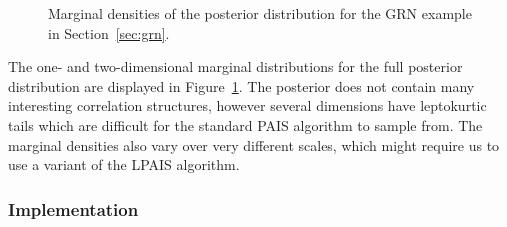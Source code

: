 \documentclass[final]{siamltex}
\begin{document}
\begin{figure}[htb]
\centering
{}%
\caption{Marginal densities of the posterior distribution for the GRN example in Section~\ref{sec:grn}.}
\label{fig:GRN_posterior}
\end{figure}

The one- and two-dimensional marginal distributions for the full posterior distribution are displayed in Figure~\ref{fig:GRN_posterior}. The posterior does not contain many interesting correlation structures, however several dimensions have leptokurtic tails which are difficult for the standard PAIS algorithm to sample from. The marginal densities also vary over very different scales, which might require us to use a variant of the LPAIS algorithm.

\subsubsection{Implementation}
\end{document}
